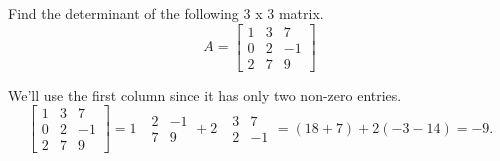 \begin{example}
	Find the determinant of the following 3 x 3 matrix.
	\begin{equation*}
		A = \begin{bmatrix}
			1 & 3 & 7 \\
			0 & 2 & -1 \\
			2 & 7 & 9
		\end{bmatrix}
	\end{equation*}
\end{example}
\noindent
We'll use the first column since it has only two non-zero entries.
\begin{equation*}
	\begin{bmatrix}
		1 & 3 & 7 \\
		0 & 2 & -1 \\
		2 & 7 & 9
	\end{bmatrix} = 1 \text{ } \begin{array}{|cc|}
		2 & -1 \\
		7 & 9
	\end{array} + 2 \text{ } \begin{array}{|cc|}
		3 & 7 \\
		2 & -1
	\end{array} = (18+7) + 2(-3-14) = -9.
\end{equation*}